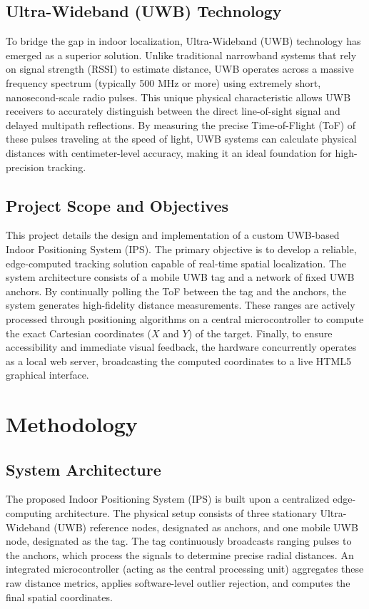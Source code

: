 \documentclass[conference]{IEEEtran}
\begin{document}
\subsection{Ultra-Wideband (UWB) Technology}
To bridge the gap in indoor localization, Ultra-Wideband (UWB) technology has emerged as a superior solution. Unlike traditional narrowband systems that rely on signal strength (RSSI) to estimate distance, UWB operates across a massive frequency spectrum (typically 500 MHz or more) using extremely short, nanosecond-scale radio pulses. This unique physical characteristic allows UWB receivers to accurately distinguish between the direct line-of-sight signal and delayed multipath reflections. By measuring the precise Time-of-Flight (ToF) of these pulses traveling at the speed of light, UWB systems can calculate physical distances with centimeter-level accuracy, making it an ideal foundation for high-precision tracking.

\subsection{Project Scope and Objectives}
This project details the design and implementation of a custom UWB-based Indoor Positioning System (IPS). The primary objective is to develop a reliable, edge-computed tracking solution capable of real-time spatial localization. The system architecture consists of a mobile UWB tag and a network of fixed UWB anchors. By continually polling the ToF between the tag and the anchors, the system generates high-fidelity distance measurements. These ranges are actively processed through positioning algorithms on a central microcontroller to compute the exact Cartesian coordinates ($X$ and $Y$) of the target. Finally, to ensure accessibility and immediate visual feedback, the hardware concurrently operates as a local web server, broadcasting the computed coordinates to a live HTML5 graphical interface.

\section{Methodology}

\subsection{System Architecture}
The proposed Indoor Positioning System (IPS) is built upon a centralized edge-computing architecture. The physical setup consists of three stationary Ultra-Wideband (UWB) reference nodes, designated as anchors, and one mobile UWB node, designated as the tag. The tag continuously broadcasts ranging pulses to the anchors, which process the signals to determine precise radial distances. An integrated microcontroller (acting as the central processing unit) aggregates these raw distance metrics, applies software-level outlier rejection, and computes the final spatial coordinates.
\end{document}
